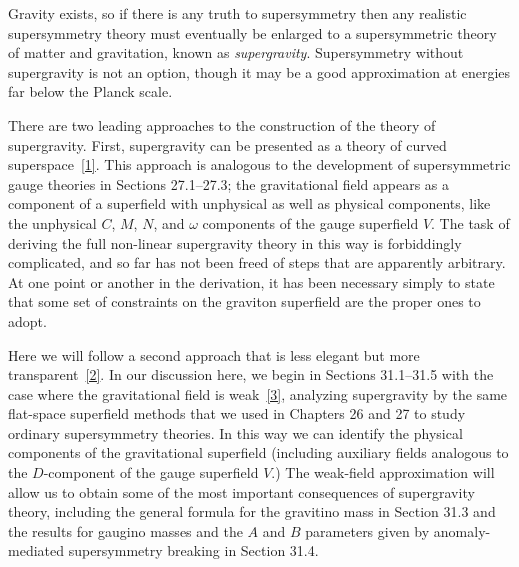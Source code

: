 
Gravity exists, so if there is any truth to supersymmetry then any realistic
supersymmetry theory must eventually be enlarged to a supersymmetric theory of
matter and gravitation, known as \emph{supergravity}. Supersymmetry without
supergravity is not an option, though it may be a good approximation at
energies far below the Planck scale.

There are two leading approaches to the construction of the theory of
supergravity. First, supergravity can be presented as a theory of curved
superspace~\hyperref[ch31-ref-1]{[1]}. This approach is analogous to the
development of supersymmetric gauge theories in Sections 27.1--27.3; the
gravitational field appears as a component of a superfield with unphysical as
well as physical components, like the unphysical \(C\), \(M\), \(N\), and
\(\omega\) components of the gauge superfield \(V\). The task of deriving the
full non-linear supergravity theory in this way is forbiddingly complicated,
and so far has not been freed of steps that are apparently arbitrary. At one
point or another in the derivation, it has been necessary simply to state that
some set of constraints on the graviton superfield are the proper ones to
adopt.

Here we will follow a second approach that is less elegant but more
transparent~\hyperref[ch31-ref-2]{[2]}. In our discussion here, we begin in
Sections 31.1--31.5 with the case where the gravitational field is
weak~\hyperref[ch31-ref-3]{[3]}, analyzing supergravity by the same flat-space
superfield methods that we used in Chapters 26 and 27 to study ordinary
supersymmetry theories. In this way we can identify the physical components
of the gravitational superfield (including auxiliary fields analogous to the
\(D\)-component of the gauge superfield \(V\).) The weak-field approximation
will allow us to obtain some of the most important consequences of
supergravity theory, including the general formula for the gravitino mass in
Section 31.3 and the results for gaugino masses and the \(A\) and \(B\)
parameters given by anomaly-mediated supersymmetry breaking in Section 31.4.

